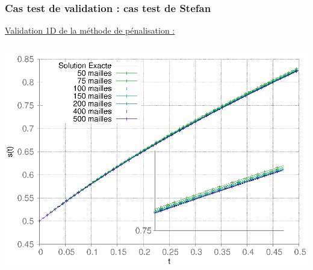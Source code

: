 \documentclass{beamer}
\begin{document}
\begin{frame}
\begin{columns}[c]
\begin{column}{0.5 \textwidth}
	\end{column}
    \begin{column}{0.5 \textwidth}
\center\begin{tikzpicture}[scale =0.26, every node/.style={scale=0.3}]

\end{tikzpicture}

   \end{column}
\end{columns}
\end{frame}



\begin{frame}
    \frametitle{Cas test de validation : cas test de Stefan}
	\scriptsize
\color{cea_rouge}\underline{Validation 1D de la méthode de pénalisation :}\color{cea_texte}\\
\begin{columns}
\begin{column}{0.5 \textwidth}

        \includegraphics[width=1\textwidth]{Figures/StefanConvDX.eps}	





\end{column}
\end{columns}
\end{frame}
\end{document}
